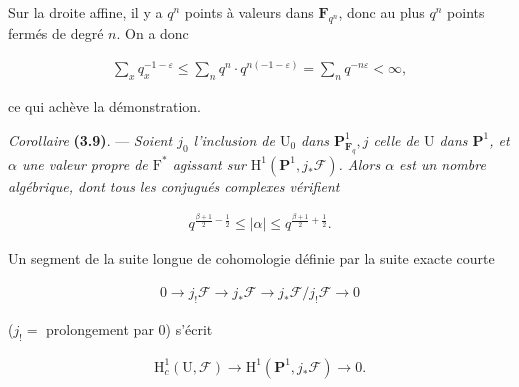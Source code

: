 \documentclass[10pt,leqno]{article}
\begin{document}
\noindent Sur la droite affine, il y a \(q^{n}\) points à valeurs dans \(\mathbf{F}_{q^{n}}\), donc au plus \(q^{n}\) points fermés de degré \(n\). On a donc\par

\begin{equation*}\begin{gathered}\sum _{x} q_{x}^{- 1- \varepsilon } \leq  \sum _{n} q^{n}\cdot q^{n(- 1- \varepsilon )} = \sum _{n} q^{- n\varepsilon } < \infty ,\end{gathered}\end{equation*}

\noindent ce qui achève la démonstration.\par

\noindent \emph{Corollaire} \textbf{(3.9)}. — {\itshape Soient \(j_{0}\) l’inclusion de \(\mathrm{U}_{0}\) dans \(\mathbf{P}^{1}_{\mathbf{F}_{q}}, j\) celle de \(\mathrm{U}\) dans \(\mathbf{P}^{1}\), et \(\alpha \) une valeur propre de \(\mathrm{F}^{*}\) agissant sur \(\mathrm{H}^{1}(\mathbf{P}^{1},j_{*}\mathcal{F} )\). Alors \(\alpha \) est un nombre algébrique, dont tous les conjugués complexes vérifient}\par

\begin{equation*}\begin{gathered}q^{\frac{\beta+1}{2}- \frac{1}{2}} \leq  |\alpha | \leq  q^{\frac{\beta+1}{2}+\frac{1}{2}}.\end{gathered}\end{equation*}

\noindent Un segment de la suite longue de cohomologie définie par la suite exacte courte\par

\begin{equation*}\begin{gathered}0 \longrightarrow  j_{!}\mathcal{F}  \longrightarrow  j_{*}\mathcal{F}  \longrightarrow  j_{*}\mathcal{F} /j_{!}\mathcal{F}  \longrightarrow  0\end{gathered}\end{equation*}

\noindent (\(j_{!} =\) prolongement par 0) s’écrit\par

\begin{equation*}\begin{gathered}\mathrm{H}_{c}^{1}(\mathrm{U},\mathcal{F} ) \longrightarrow  \mathrm{H}^{1}(\mathbf{P}^{1},j_{*}\mathcal{F} ) \longrightarrow  0.\end{gathered}\end{equation*}
\end{document}

